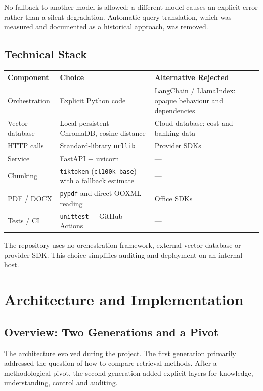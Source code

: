 \documentclass[a4paper,12pt,openany]{report}
\begin{document}
No fallback to another model is allowed: a different model causes an explicit error rather than a
silent degradation. Automatic query translation, which was measured and documented as a historical
approach, was removed.

\section{Technical Stack}
\begin{table}[htbp]
\centering
\small
\begin{tabular}{p{3.2cm}p{5.6cm}p{5.4cm}}
\toprule
\textbf{Component} & \textbf{Choice} & \textbf{Alternative Rejected} \\
\midrule
Orchestration & Explicit Python code & LangChain / LlamaIndex: opaque behaviour and dependencies \\
Vector database & Local persistent ChromaDB, cosine distance & Cloud database: cost and banking data \\
HTTP calls & Standard-library \texttt{urllib} & Provider SDKs \\
Service & FastAPI + uvicorn & — \\
Chunking & \texttt{tiktoken} (\texttt{cl100k\_base}) with a fallback estimate & — \\
PDF / DOCX & \texttt{pypdf} and direct OOXML reading & Office SDKs \\
Tests / CI & \texttt{unittest} + GitHub Actions & — \\
\bottomrule
\end{tabular}
\end{table}

The repository uses no orchestration framework, external vector database or provider SDK. This
choice simplifies auditing and deployment on an internal host.

\chapter{Architecture and Implementation}

\section{Overview: Two Generations and a Pivot}
The architecture evolved during the project. The first generation primarily addressed the question
of how to compare retrieval methods. After a methodological pivot, the second generation added
explicit layers for knowledge, understanding, control and auditing.
\end{document}

